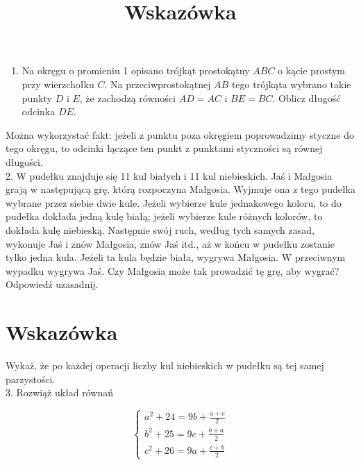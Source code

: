\documentclass[10pt]{article}
\title{Wskazówka }
\author{}
\date{}
\begin{document}
\maketitle
\begin{enumerate}
  \item Na okręgu o promieniu 1 opisano trójkąt prostokątny \(A B C\) o kącie prostym przy wierzchołku \(C\). Na przeciwprostokątnej \(A B\) tego trójkąta wybrano takie punkty \(D\) i \(E\), że zachodzą równości \(A D=A C\) i \(B E=B C\). Oblicz długość odcinka \(D E\).
\end{enumerate}

Można wykorzystać fakt: jeżeli z punktu poza okręgiem poprowadzimy styczne do tego okręgu, to odcinki łączące ten punkt z punktami styczności są równej długości.\\
2. W pudełku znajduje się 11 kul białych i 11 kul niebieskich. Jaś i Małgosia grają w następującą grę, którą rozpoczyna Małgosia. Wyjmuje ona z tego pudełka wybrane przez siebie dwie kule. Jeżeli wybierze kule jednakowego koloru, to do pudełka dokłada jedną kulę białą; jeżeli wybierze kule różnych kolorów, to dokłada kulę niebieską. Następnie swój ruch, według tych samych zasad, wykonuje Jaś i znów Małgosia, znów Jaś itd., aż w końcu w pudełku zostanie tylko jedna kula. Jeżeli ta kula będzie biała, wygrywa Małgosia. W przeciwnym wypadku wygrywa Jaś. Czy Małgosia może tak prowadzić tę grę, aby wygrać? Odpowiedź uzasadnij.

\section*{Wskazówka}
Wykaż, że po każdej operacji liczby kul niebieskich w pudełku są tej samej parzystości.\\
3. Rozwiąż układ równań

\[
\left\{\begin{array}{l}
a^{2}+24=9 b+\frac{a+c}{2} \\
b^{2}+25=9 c+\frac{b+a}{2} \\
c^{2}+26=9 a+\frac{c+b}{2}
\end{array}\right.
\]
\end{document}
